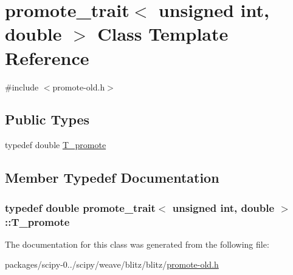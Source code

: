 \hypertarget{classpromote__trait_3_01unsigned_01int_00_01double_01_4}{}\section{promote\+\_\+trait$<$ unsigned int, double $>$ Class Template Reference}
\label{classpromote__trait_3_01unsigned_01int_00_01double_01_4}


{\ttfamily \#include $<$promote-\/old.\+h$>$}

\subsection*{Public Types}
\begin{DoxyCompactItemize}
\item 
typedef double \hyperlink{classpromote__trait_3_01unsigned_01int_00_01double_01_4_a67c8cb9e1300a8d66c3e32f51b7081e1}{T\+\_\+promote}
\end{DoxyCompactItemize}


\subsection{Member Typedef Documentation}
\hypertarget{classpromote__trait_3_01unsigned_01int_00_01double_01_4_a67c8cb9e1300a8d66c3e32f51b7081e1}{}
\subsubsection[{T\+\_\+promote}]{\setlength{\rightskip}{0pt plus 5cm}typedef double {\bf promote\+\_\+trait}$<$ unsigned int, double $>$\+::{\bf T\+\_\+promote}}\label{classpromote__trait_3_01unsigned_01int_00_01double_01_4_a67c8cb9e1300a8d66c3e32f51b7081e1}


The documentation for this class was generated from the following file\+:\begin{DoxyCompactItemize}
\item 
packages/scipy-\/0../scipy/weave/blitz/blitz/\hyperlink{promote-old_8h}{promote-\/old.\+h}\end{DoxyCompactItemize}
